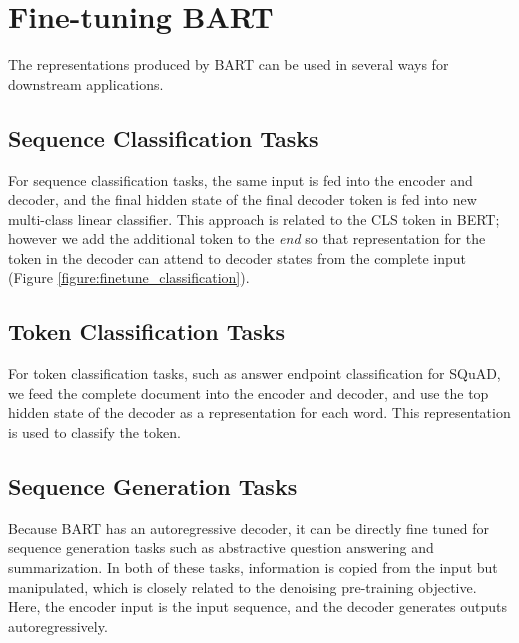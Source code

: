 \documentclass{article} %
\newcommand{\omer}[1]{{\color{blue} [Omer: #1]}}
\begin{document}
\section{Fine-tuning BART}


The representations produced by BART can be used in several ways for downstream applications. 


\subsection{Sequence Classification Tasks}
For sequence classification tasks, the same input is fed into the encoder and decoder, and the final hidden state of the final decoder token is fed into new multi-class linear classifier.  This approach is related to the CLS token in BERT; however we add the additional token to the \emph{end} so that representation for the token in the decoder can attend to decoder states from the complete input (Figure \ref{figure:finetune_classification}).

\subsection{Token Classification Tasks}
For token classification tasks, such as answer endpoint classification for SQuAD, we feed the complete document into the encoder and decoder, and use the top hidden state of the decoder as a representation for each word. This representation is used to classify the token.


\subsection{Sequence Generation Tasks}
Because BART has an autoregressive decoder, it can be directly fine tuned for sequence generation tasks such as abstractive question answering and summarization. In both of these tasks, information is copied from the input but manipulated, which is closely related to the denoising pre-training objective. Here, the encoder input is the input sequence, and the decoder generates outputs autoregressively.
\end{document}
